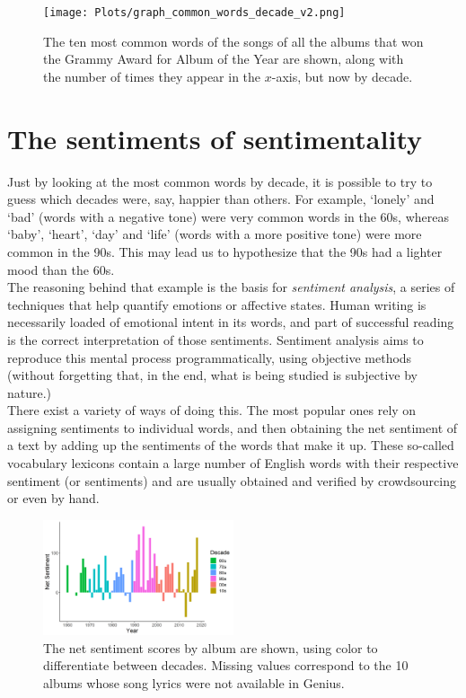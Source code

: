\documentclass{article}
\begin{document}
\begin{figure}[h]
    \centering
    \texttt{[image: Plots/graph\_common\_words\_decade\_v2.png]}
    \caption{The ten most common words of the songs of all the albums that won the Grammy Award for Album of the Year are shown, along with the number of times they appear in the $x$-axis, but now by decade.}
    \label{fig:common_words_decade}
\end{figure}





\section*{The sentiments of sentimentality}


Just by looking at the most common words by decade, it is possible to try to guess which decades were, say, happier than others. For example, `lonely' and `bad' (words with a negative tone) were very common words in the 60s, whereas `baby', `heart', `day' and `life' (words with a more positive tone) were more common in the 90s. This may lead us to hypothesize that the 90s had a lighter mood than the 60s. \\


The reasoning behind that example is the basis for \textit{sentiment analysis}, a series of techniques that help quantify emotions or affective states. Human writing is necessarily loaded of emotional intent in its words, and part of successful reading is the correct interpretation of those sentiments. Sentiment analysis aims to reproduce this mental process programmatically, using objective methods (without forgetting that, in the end, what is being studied is subjective by nature.) \\



There exist a variety of ways of doing this. The most popular ones rely on assigning sentiments to individual words, and then obtaining the net sentiment of a text by adding up the sentiments of the words that make it up. These so-called vocabulary lexicons contain a large number of English words with their respective sentiment (or sentiments) and are usually obtained and verified by crowdsourcing or even by hand. \\


\begin{figure}
    \centering
    \includegraphics[width=0.5\textwidth]{Plots/graph_annual_sentiment.png}
    \caption{The net sentiment scores by album are shown, using color to differentiate between decades. Missing values correspond to the 10 albums whose song lyrics were not available in Genius.}
    \label{fig:annual_sentiment}
\end{figure}
\end{document}

